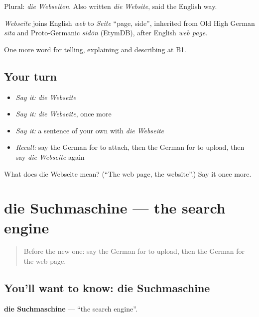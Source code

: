 Plural: \emph{die Webseiten}. Also written \emph{die Website}, said the English way.

\begin{cousinweb}
\emph{Webseite} joins English \emph{web} to \emph{Seite} \textquotedblleft{}page, side\textquotedblright{}, inherited from Old High German \emph{sīta} and Proto-Germanic \emph{sīdōn} (EtymDB), after English \emph{web page}.
\end{cousinweb}

\begin{grammarlens}[title={What you've built}]
One more word for telling, explaining and describing at B1.
\end{grammarlens}

\subsection*{Your turn}
\begin{itemize}
\raggedright
  \item \emph{Say it:} \emph{die Webseite}
  \item \emph{Say it:} \emph{die Webseite}, once more
  \item \emph{Say it:} a sentence of your own with \emph{die Webseite}
  \item \emph{Recall:} say the German for to attach, then the German for to upload, then say \emph{die Webseite} again
\end{itemize}

\begin{tcolorbox}[breakable,colback=teal!4,colframe=teal!35!black,title={Before you move on}]
What does die Webseite mean? (\textquotedblleft{}The web page, the website\textquotedblright{}.) Say it once more.
\end{tcolorbox}
\section[die Suchmaschine]{die Suchmaschine — the search engine}

\label{lesson:GE-C394-suchmaschine}



\begin{quote}
Before the new one: say the German for to upload, then the German for the web page.
\end{quote}

\subsection*{You'll want to know: die Suchmaschine}
\textbf{die Suchmaschine} — \textquotedblleft{}the search engine\textquotedblright{}.

